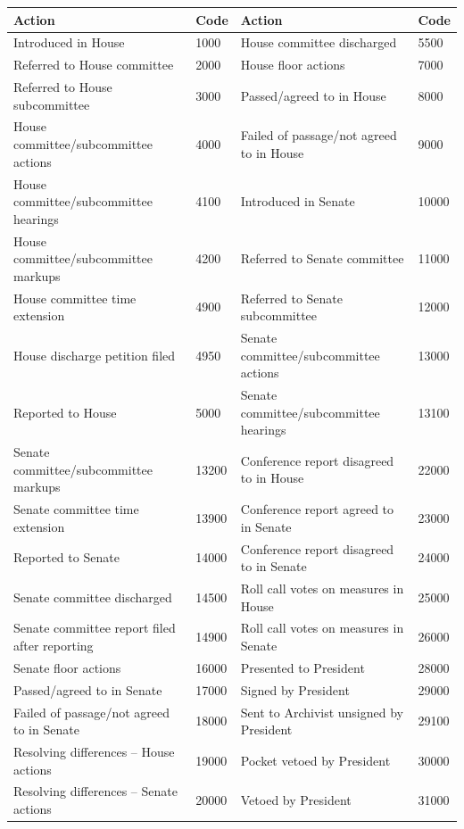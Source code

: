 \documentclass[letterpaper,11pt]{article}
\begin{document}
\begin{table}[!h]
\centering
\footnotesize
\begin{tabular}{ll|ll}
\hline
\textbf{Action} & \textbf{Code} & \textbf{Action} & \textbf{Code} \\
\hline
Introduced in House & 1000 & House committee discharged & 5500 \\
Referred to House committee & 2000 & House floor actions & 7000 \\
Referred to House subcommittee & 3000 & Passed/agreed to in House & 8000 \\
House committee/subcommittee actions & 4000 & Failed of passage/not agreed to in House & 9000 \\
House committee/subcommittee hearings & 4100 & Introduced in Senate & 10000 \\
House committee/subcommittee markups & 4200 & Referred to Senate committee & 11000 \\
House committee time extension & 4900 & Referred to Senate subcommittee & 12000 \\
House discharge petition filed & 4950 & Senate committee/subcommittee actions & 13000 \\
Reported to House & 5000 & Senate committee/subcommittee hearings & 13100 \\
Senate committee/subcommittee markups & 13200 & Conference report disagreed to in House & 22000 \\
Senate committee time extension & 13900 & Conference report agreed to in Senate & 23000 \\
Reported to Senate & 14000 & Conference report disagreed to in Senate & 24000 \\
Senate committee discharged & 14500 & Roll call votes on measures in House & 25000 \\
Senate committee report filed after reporting & 14900 & Roll call votes on measures in Senate & 26000 \\
Senate floor actions & 16000 & Presented to President & 28000 \\
Passed/agreed to in Senate & 17000 & Signed by President & 29000 \\
Failed of passage/not agreed to in Senate & 18000 & Sent to Archivist unsigned by President & 29100 \\
Resolving differences -- House actions & 19000 & Pocket vetoed by President & 30000 \\
Resolving differences -- Senate actions & 20000 & Vetoed by President & 31000 \\

\end{tabular}
\end{table}
\end{document}

